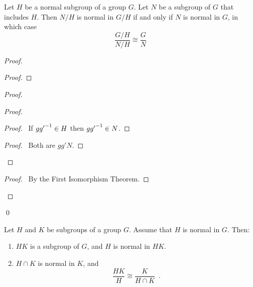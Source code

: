 \begin{prop}
Let $H$ be a normal subgroup of a group $G$. Let $N$ be a subgroup of $G$ that includes $H$. Then $N / H$ is normal in $G/H$ if and only if $N$ is normal in $G$, in which case
\[ \frac{G/H}{N/H} \cong \frac{G}{N} \]
\end{prop}

\begin{proof}
\pf
{}
\begin{proof}
\end{proof}
\begin{proof}
	\begin{proof}
		\begin{proof}
			\pf\ If $g {g'}^{-1} \in H$ then $g {g'}^{-1} \in N$.
		\end{proof}
		\begin{proof}
			\pf\ Both are $gg'N$.
		\end{proof}
	\end{proof}
	\begin{proof}
		\pf\ By the First Isomorphism Theorem.
	\end{proof}
\end{proof}
\qed
\end{proof}

\begin{prop}
Let $H$ and $K$ be subgroups of a group $G$. Assume that $H$ is normal in $G$. Then:
\begin{enumerate}
\item $HK$ is a subgroup of $G$, and $H$ is normal in $HK$.
\item $H \cap K$ is normal in $K$, and
\[ \frac{HK}{H} \cong \frac{K}{H \cap K} \enspace . \]
\end{enumerate}
\end{prop}

